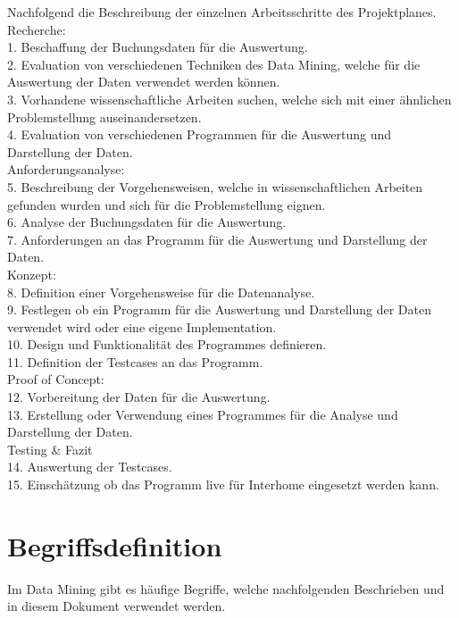 {\parindent0pt %
Nachfolgend die Beschreibung der einzelnen Arbeitsschritte des Projektplanes.\\

Recherche:\\
1. Beschaffung der Buchungsdaten für die Auswertung.\\
2. Evaluation von verschiedenen Techniken des Data Mining, welche für die Auswertung der Daten verwendet werden können.\\
3. Vorhandene wissenschaftliche Arbeiten suchen, welche sich mit einer ähnlichen Problemstellung auseinandersetzen.\\
4. Evaluation von verschiedenen Programmen für die Auswertung und Darstellung der Daten.\\

Anforderungsanalyse:\\
5. Beschreibung der Vorgehensweisen, welche in wissenschaftlichen Arbeiten gefunden wurden und sich für die Problemstellung eignen. \\
6. Analyse der Buchungsdaten für die Auswertung.\\
7. Anforderungen an das Programm für die Auswertung und Darstellung der Daten.\\

Konzept:\\
8. Definition einer Vorgehensweise für die Datenanalyse.\\
9. Festlegen ob ein Programm für die Auswertung und Darstellung der Daten verwendet wird oder eine eigene Implementation.\\
10. Design und Funktionalität des Programmes definieren.\\
11. Definition der Testcases an das Programm.\\

Proof of Concept:\\
12. Vorbereitung der Daten für die Auswertung.\\
13. Erstellung oder Verwendung eines Programmes für die Analyse und Darstellung der Daten.\\

Testing \& Fazit\\
14. Auswertung der Testcases.\\
15. Einschätzung ob das Programm live für Interhome eingesetzt werden kann.
}

\section{Begriffsdefinition}
Im Data Mining gibt es häufige Begriffe, welche nachfolgenden Beschrieben und in diesem Dokument verwendet werden.

